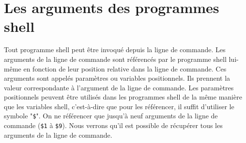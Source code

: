 %
%


\setcounter{remarque-cnt}{1}
\setcounter{example-cnt}{1}
\chapter{Les arguments des programmes shell}

Tout programme shell peut {\^e}tre invoqu{\'e} depuis la ligne de
commande. Les arguments de la ligne de commande
sont r{\'e}f{\'e}renc{\'e}s par le programme shell lui-m{\^e}me en
fonction de leur position relative dans la ligne de commande. Ces
arguments sont appel{\'e}s param{\`e}tres ou
variables positionnels. Ils prennent la
valeur correspondante {\`a} l'argument de la ligne de commande. Les
param{\`e}tres positionnels peuvent {\^e}tre utilis{\'e}s dans les
programmes shell de la m{\^e}me mani{\`e}re que les variables shell,
c'est-{\`a}-dire que pour les r{\'e}f{\'e}rencer, il suffit d'utiliser
le symbole "\verb=$=". On ne r{\'e}f{\'e}rencer que jusqu'{\`a} neuf
arguments de la ligne de commande (\verb=$1= {\`a} \verb=$9=). Nous
verrons qu'il est possible de r{\'e}cup{\'e}rer tous les arguments de la
ligne de commande.

